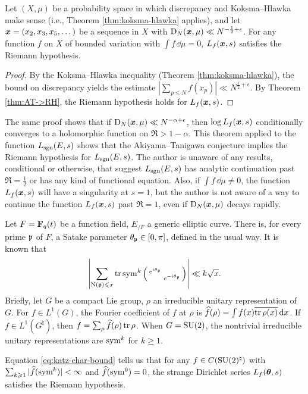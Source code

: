 \begin{theorem}
Let $(X,\mu)$ be a probability space in which discrepancy and Koksma--Hlawka 
make sense (i.e., Theorem \ref{thm:koksma-hlawka} applies), and let 
${\boldsymbol x}=(x_2,x_3,x_5,\dots)$ be a sequence in $X$ with 
$\operatorname{D}_N({\boldsymbol x},\mu) \ll N^{-\frac 1 2+\epsilon}$. For any function $f$ on $X$ of 
bounded variation with $\int f\, \dd\mu = 0$, $L_f({\boldsymbol x},s)$ satisfies 
the Riemann hypothesis. 
\end{theorem}
\begin{proof}
By the Koksma--Hlawka inequality (Theorem \ref{thm:koksma-hlawka}), the bound 
on discrepancy yields the estimate 
$\left| \sum_{p\leqslant N} f(x_p)\right| \ll N^{\frac 1 2+\epsilon}$. 
By Theorem \ref{thm:AT->RH}, the Riemann hypothesis holds for $L_f({\boldsymbol x},s)$. 
\end{proof}

The same proof shows that if $\operatorname{D}_N({\boldsymbol x},\mu)\ll N^{-\alpha+\epsilon}$, then 
$\log L_f({\boldsymbol x},s)$ conditionally converges to a holomorphic function on 
$\Re > 1 - \alpha$. This theorem applied to the function $L_{\operatorname{sgn}}(E,s)$ shows 
that the Akiyama--Tanigawa conjecture implies the Riemann hypothesis for 
$L_{\operatorname{sgn}}(E,s)$. The author is unaware of any results, conditional or 
otherwise, that suggest $L_{\operatorname{sgn}}(E,s)$ has analytic continuation past 
$\Re = \frac 1 2$ or has any kind of functional equation. Also, if 
$\int f\, \dd\mu \ne 0$, the function $L_f({\boldsymbol x},s)$ will have a singularity at 
$s = 1$, but the author is not aware of a way to continue the function 
$L_f({\boldsymbol x},s)$ past $\Re = 1$, even if $\operatorname{D}_N({\boldsymbol x},\mu)$ decays rapidly. 

Let $F = \mathbf{F}_q(t)$ be a function field, $E_{/F}$ a generic elliptic curve. 
There is, for every prime $\mathfrak{p}$ of $F$, a Satake parameter 
$\theta_{\mathfrak{p}} \in [0,\pi]$, defined in the usual way. It is known 
\cite[Ch.~3]{katz-1988} that
\begin{equation}\label{eq:katz-char-bound}
	\left|\sum_{\operatorname{N}(\mathfrak{p}) \leqslant x} \operatorname{tr}\operatorname{sym}^k\left(\begin{smallmatrix} e^{i \theta_{\mathfrak{p}}} &  \\  & e^{- i \theta_{\mathfrak{p}}} \end{smallmatrix}\right) \right| \ll k \sqrt{x} .
\end{equation}
Briefly, let $G$ be a compact Lie group, $\rho$ an irreducible unitary 
representation of $G$. For $f\in L^1(G)$, the Fourier coefficient of $f$ at 
$\rho$ is $\widehat f(\rho) = \int f(x) \overline{\operatorname{tr}\rho(x)}\, \mathrm{d} x$. If 
$f\in L^1(G^\natural)$, then $f = \sum_\rho \widehat f(\rho) \operatorname{tr} \rho$. When 
$G = \operatorname{SU}(2)$, the nontrivial irreducible unitary representations are 
$\operatorname{sym}^k$ for $k\geqslant 1$. 

Equation \eqref{eq:katz-char-bound} tells us that for any 
$f\in C(\operatorname{SU}(2)^\natural)$ with 
$\sum_{k\geqslant 1} |\widehat f(\operatorname{sym}^k)|<\infty$ and $\widehat f(\operatorname{sym}^0) = 0$, 
the strange Dirichlet series $L_f({\boldsymbol\theta},s)$ satisfies the Riemann hypothesis. 

